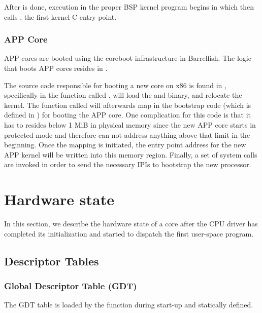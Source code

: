 \documentclass[a4paper,11pt,twoside]{report}
\begin{document}
{{After  is done, execution in the proper BSP kernel program
begins in  which then calls
, the first kernel C entry point.

\subsubsection{APP Core}

APP cores are booted using the coreboot infrastructure in Barrelfish. The
logic that boots APP cores resides in .

The source code responsible for booting a new core on x86 is found in
, specifically in the function called
.  will load the
 and  binary, and relocate the kernel. The
function called  will afterwards map in the
bootstrap code (which is defined in ) for booting the
APP core. One complication for this code is that it has to resides below 1 MiB
in physical memory since the new APP core starts in protected mode and
therefore can not address anything above that limit in the beginning. Once the
mapping is initiated, the entry point address for the new APP kernel will be
written into this memory region. Finally, a set of system calls are invoked
in order to send the necessary IPIs to bootstrap the new processor.

\section{Hardware state}

In this section, we describe the hardware state of a core after the CPU driver
has completed its initialization and started to dispatch the first
user-space program.

\subsection{Descriptor Tables}

\subsubsection{Global Descriptor Table (GDT)}

The GDT table is loaded by the  function during start-up and statically defined.

}}
\end{document}
